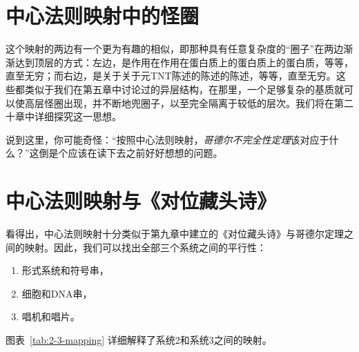 \section{中心法则映射中的怪圈}

这个映射的两边有一个更为有趣的相似，即那种具有任意复杂度的“圈子”在两边渐渐达到顶层的方式：左边，是作用在作用在蛋白质上的蛋白质上的蛋白质，等等，直至无穷；而右边，是关于关于元TNT陈述的陈述的陈述，等等，直至无穷。这些都类似于我们在第五章中讨论过的异层结构，在那里，一个足够复杂的基质就可以使高层怪圈出现，并不断地兜圈子，以至完全隔离于较低的层次。我们将在第二十章中详细探究这一思想。

说到这里，你可能奇怪：“按照中心法则映射，\emph{哥德尔不完全性定理}该对应于什么？”这倒是个应该在读下去之前好好想想的问题。

\section{中心法则映射与《对位藏头诗》}

看得出，中心法则映射十分类似于第九章中建立的《对位藏头诗》与哥德尔定理之间的映射。因此，我们可以找出全部三个系统之间的平行性：
\begin{enumerate}
\item 形式系统和符号串，
\item 细胞和DNA串，
\item 唱机和唱片。
\end{enumerate}
图表~\ref{tab:2-3-mapping} 详细解释了系统2和系统3之间的映射。

